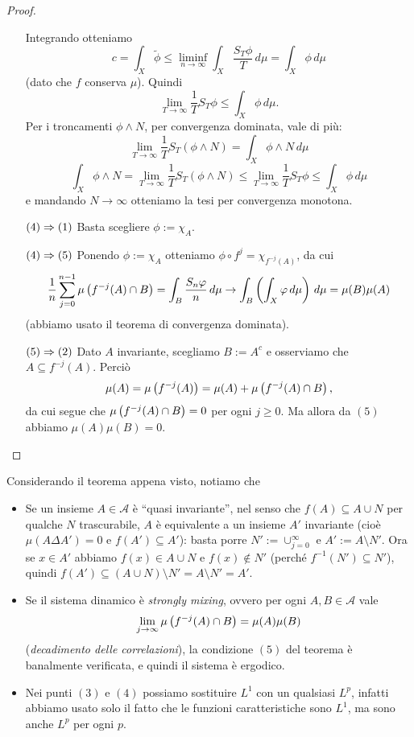 \begin{proof}
\begin{itemize}
	    Integrando otteniamo 
	    \[c=\int_X\tilde{\phi} \le \liminf_{n\to\infty}\int_X\frac{S_T\phi}{T}\,d\mu=\int_X\phi\,d\mu\]
	    (dato che $f$ conserva $\mu$). Quindi 
	    \[\lim_{T\to\infty}\frac{1}{T}S_T\phi\le \int_X\phi\,d\mu.\] 
	    Per i troncamenti $\phi\wedge N$, per convergenza dominata, vale di più: 
	    \[\lim_{T\to\infty}\frac{1}{T}S_T(\phi\wedge N)=\int_X \phi\wedge N\,d\mu\]
	    \[ \int_X\phi\wedge N=\lim_{T\to\infty}\frac{1}{T}S_T(\phi\wedge N)\le\lim_{T\to\infty}\frac{1}{T}S_T\phi\le \int_X\phi\,d\mu \]
	    e mandando $N\to\infty$ otteniamo la tesi per convergenza monotona.
    \item[$(4)\Rightarrow (1)$] Basta scegliere $\phi:=\chi_A$.
    \item[$(4)\Rightarrow(5)$] Ponendo $\phi:=\chi_A$ otteniamo $\phi\circ f^j=\chi_{f^{-j}(A)}$, da cui
	    \[ \frac{1}{n}\sum_{j=0}^{n-1}\mu\left(f^{-j}(A)\cap B\right)=\int_B\frac{S_n\varphi}{n}\,d\mu\to\int_B\left(\int_X\varphi\,d\mu\right)\,d\mu=\mu(B)\mu(A) \]
	    (abbiamo usato il teorema di convergenza dominata).
    \item[$(5)\Rightarrow (2)$] Dato $A$ invariante, scegliamo $B:=A^c$ e osserviamo che $A\subseteq f^{-j}(A)$. Perciò
	    \[ \mu(A)=\mu\left(f^{-j}(A)\right)=\mu(A)+\mu\left(f^{-j}(A)\cap B\right), \]
	    da cui segue che $\mu\left(f^{-j}(A)\cap B\right)=0$ per ogni $j\ge 0$. Ma allora da $(5)$ abbiamo $\mu(A)\mu(B)=0$.
      \end{itemize}
\end{proof}

\begin{oss}\label{ossergodicita} Considerando il teorema appena visto, notiamo che \begin{itemize}
    \item Se un insieme $A\in\mathcal{A}$ è ``quasi invariante'', nel senso che $f(A)\subseteq A\cup N$ per qualche
      $N$ trascurabile, $A$ è equivalente a un insieme $A'$ invariante (cioè $\mu(A\Delta A')=0$ e $f(A')\subseteq A'$):
      basta porre $N':=\cup_{j=0}^\infty$ e $A':=A\setminus N'$. Ora se $x\in A'$ abbiamo
      $f(x)\in A\cup N$ e $f(x)\nin N'$ (perché $f^{-1}(N')\subseteq N'$), quindi $f(A')\subseteq (A\cup N)\setminus N'=A\setminus N'=A'$.
    \item Se il sistema dinamico è \emph{strongly mixing}, ovvero per ogni $A,B\in\mathcal{A}$ vale
      \[\lim_{j\to\infty}\mu\left(f^{-j}(A)\cap B\right)=\mu(A)\mu(B)\] 
      (\emph{decadimento delle correlazioni}), la condizione $(5)$ del teorema è banalmente verificata, e quindi il sistema è ergodico.
    \item Nei punti $(3)$ e $(4)$ possiamo sostituire $L^1$ con un qualsiasi $L^p$, infatti abbiamo usato solo il fatto che le funzioni caratteristiche sono $L^1$, 
      ma sono anche $L^p$ per ogni $p$.
\end{itemize}
\end{oss}


